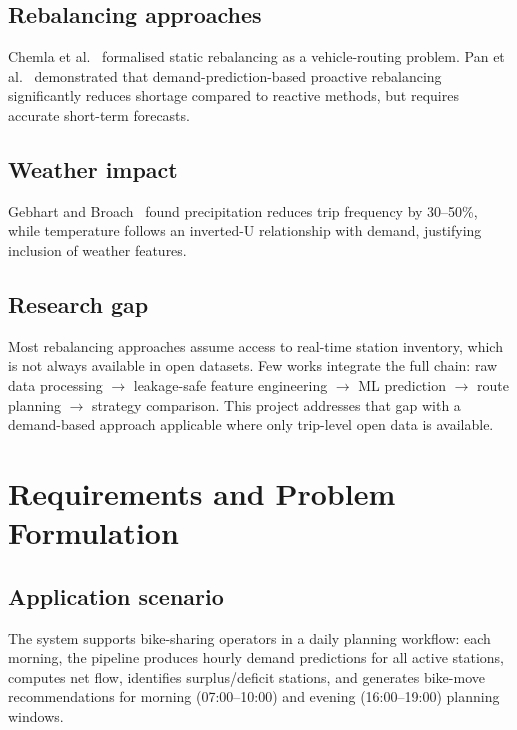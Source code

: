 \documentclass[12pt,a4paper]{report}
\begin{document}
\section{Rebalancing approaches}

Chemla et al.~\cite{chemla2013} formalised static rebalancing as a
vehicle-routing problem. Pan et al.~\cite{pan2019} demonstrated that
demand-prediction-based proactive rebalancing significantly reduces
shortage compared to reactive methods, but requires accurate
short-term forecasts.

\section{Weather impact}

Gebhart and Broach~\cite{gebhart2012} found precipitation reduces trip
frequency by 30--50\%, while temperature follows an inverted-U
relationship with demand, justifying inclusion of weather features.

\section{Research gap}

Most rebalancing approaches assume access to real-time station
inventory, which is not always available in open datasets. Few works
integrate the full chain: raw data processing $\rightarrow$
leakage-safe feature engineering $\rightarrow$ ML prediction
$\rightarrow$ route planning $\rightarrow$ strategy comparison. This
project addresses that gap with a demand-based approach applicable
where only trip-level open data is available.

\chapter{Requirements and Problem Formulation}

\section{Application scenario}

The system supports bike-sharing operators in a daily planning
workflow: each morning, the pipeline produces hourly demand
predictions for all active stations, computes net flow, identifies
surplus/deficit stations, and generates bike-move recommendations
for morning (07:00--10:00) and evening (16:00--19:00) planning
windows.
\end{document}
